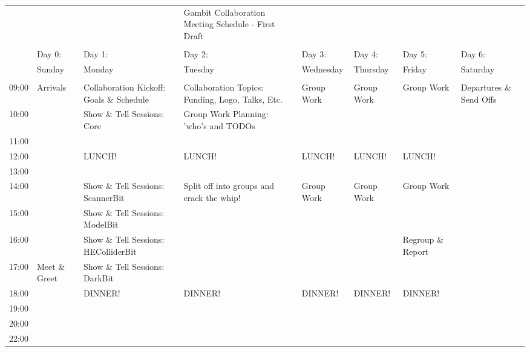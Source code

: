 \documentclass{standalone}
\begin{document}
\begin{tabular}{l|l|l|l|l|l|l|l}
&&&Gambit Collaboration Meeting Schedule - First Draft&&&& \\
&&&&&&& \\
&Day 0:&Day 1:&Day 2:&Day 3:&Day 4:&Day 5:&Day 6: \\
&Sunday&Monday&Tuesday&Wednesday&Thursday&Friday&Saturday \\
&&&&&&& \\
09:00&Arrivals&Collaboration Kickoff: Goals \& Schedule&Collaboration Topics: Funding, Logo, Talks, Etc.&Group Work&Group Work&Group Work&Departures \& Send Offs \\
10:00&&Show \& Tell Sessions: Core&Group Work Planning: 'who's and TODOs&&&& \\
11:00&&&&&&& \\
12:00&&LUNCH!&LUNCH!&LUNCH!&LUNCH!&LUNCH!& \\
13:00&&&&&&& \\
14:00&&Show \& Tell Sessions: ScannerBit&Split off into groups and crack the whip!&Group Work&Group Work&Group Work&  \\
15:00&&Show \& Tell Sessions: ModelBit&&&&& \\
16:00&&Show \& Tell Sessions: HEColliderBit&&&&Regroup \& Report& \\
17:00&Meet \& Greet&Show \& Tell Sessions: DarkBit&&&&& \\
18:00&&DINNER!&DINNER!&DINNER!&DINNER!&DINNER!& \\
19:00&&&&&&& \\
20:00&&&&&&& \\
22:00&&&&&&& \\
\end{tabular} \\
\end{document}
